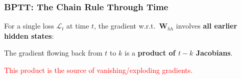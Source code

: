 \documentclass[notes,11pt, aspectratio=169]{beamer}
\newcommand{\vx}{\mathbf{x}}
\newcommand{\vb}{\mathbf{b}}
\newcommand{\vh}{\mathbf{h}}
\newcommand{\vz}{\mathbf{z}}
\newcommand{\vW}{\mathbf{W}}
\newcommand{\pd}[2]{\frac{\partial #1}{\partial #2}}
\begin{document}
\begin{frame}
\frametitle{BPTT: The Chain Rule Through Time}

For a single loss $\mathcal{L}_t$ at time $t$, the gradient w.r.t.\ $\vW_{hh}$ involves \textbf{all earlier hidden states}:

\vspace{6pt}

\vspace{4pt}
The gradient flowing back from $t$ to $k$ is a \textbf{product of $t-k$ Jacobians}.

\textcolor{red}{This product is the source of vanishing/exploding gradients.}
\end{frame}
\end{document}
